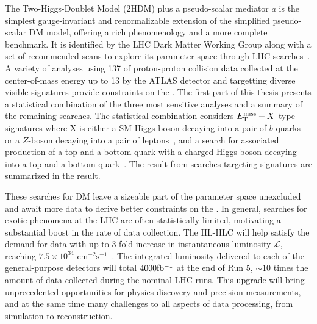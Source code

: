 The Two-Higgs-Doublet Model \cite{Bauer:2017ota} (2HDM) plus a pseudo-scalar mediator $a$ is the simplest gauge-invariant and renormalizable extension of the simplified pseudo-scalar DM model, offering a rich phenomenology and a more complete benchmark.
It is identified by the LHC Dark Matter Working Group along with a set of recommended scans to explore its parameter space through LHC searches~\cite{2HDMWGproxi}. 
A variety of analyses using 137 \ifb of proton-proton collision data collected at the center-of-mass energy up to 13 \TeV by the ATLAS detector and targetting diverse visible signatures provide constraints on the \thdma. 
The first part of this thesis presents a statistical combination of the three most sensitive analyses and a summary of the remaining searches.
The statistical combination considers $E_{\mathrm{T}}^{\mathrm{miss}}+X$-type signatures where X is either a SM Higgs boson decaying into a pair of $b$-quarks~\cite{EXOT-2018-46} or a $Z$-boson decaying into a pair of leptons~\cite{HIGG-2018-26}, and a search for associated production of a top and a bottom quark with a charged Higgs boson decaying into a top and a bottom quark~\cite{HDBS-2018-51}.
The result from searches targeting signatures are summarized in the result. 

These searches for DM leave a sizeable part of the parameter space unexcluded and await more data to derive better constraints on the \thdma. 
In general, searches for exotic phenomena at the LHC are often statistically limited, motivating a substantial boost in the rate of data collection. 
The HL-HLC will help satisfy the demand for data with up to 3-fold increase in instantaneous luminosity $\mathcal{L}$, reaching $7.5\times 10^{34}$ $\mathrm{cm}^{-2}\mathrm{s^{-1}}$~\cite{Aberle:2749422}.
The integrated luminosity delivered to each of the general-purpose detectors will total $4000\mbox{fb\(^{-1}\)}$ at the end of Run 5, $\sim 10$ times the amount of data collected during the nominal LHC runs. 
This upgrade will bring unprecedented opportunities for physics discovery and precision measurements, and at the same time many challenges to all aspects of data processing, from simulation to reconstruction. 

